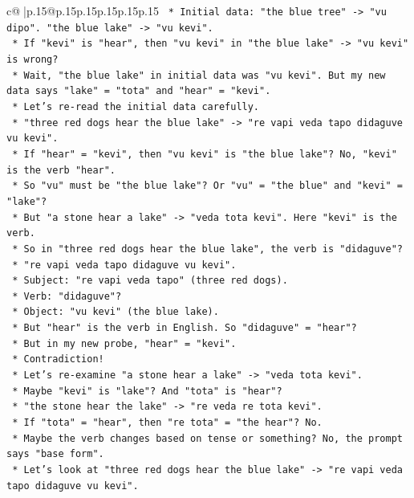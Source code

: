 \documentclass{article}
\begin{document}
{\begin{supertabular}{c@{$\;$}|p{.15\linewidth}@{}p{.15\linewidth}p{.15\linewidth}p{.15\linewidth}p{.15\linewidth}p{.15\linewidth}}
{{{\texttt{    *   Initial data: "the blue tree" {-}> "vu dipo". "the blue lake" {-}> "vu kevi".} \\
\texttt{    *   If "kevi" is "hear", then "vu kevi" in "the blue lake" {-}> "vu kevi" is wrong?} \\
\texttt{    *   Wait, "the blue lake" in initial data was "vu kevi". But my new data says "lake" = "tota" and "hear" = "kevi".} \\
\texttt{    *   Let's re{-}read the initial data carefully.} \\
\texttt{    *   "three red dogs hear the blue lake" {-}> "re vapi veda tapo didaguve vu kevi".} \\
\texttt{    *   If "hear" = "kevi", then "vu kevi" is "the blue lake"? No, "kevi" is the verb "hear".} \\
\texttt{    *   So "vu" must be "the blue lake"? Or "vu" = "the blue" and "kevi" = "lake"?} \\
\texttt{    *   But "a stone hear a lake" {-}> "veda tota kevi". Here "kevi" is the verb.} \\
\texttt{    *   So in "three red dogs hear the blue lake", the verb is "didaguve"?} \\
\texttt{    *   "re vapi veda tapo didaguve vu kevi".} \\
\texttt{    *   Subject: "re vapi veda tapo" (three red dogs).} \\
\texttt{    *   Verb: "didaguve"?} \\
\texttt{    *   Object: "vu kevi" (the blue lake).} \\
\texttt{    *   But "hear" is the verb in English. So "didaguve" = "hear"?} \\
\texttt{    *   But in my new probe, "hear" = "kevi".} \\
\texttt{    *   Contradiction!} \\
\texttt{    *   Let's re{-}examine "a stone hear a lake" {-}> "veda tota kevi".} \\
\texttt{    *   Maybe "kevi" is "lake"? And "tota" is "hear"?} \\
\texttt{    *   "the stone hear the lake" {-}> "re veda re tota kevi".} \\
\texttt{    *   If "tota" = "hear", then "re tota" = "the hear"? No.} \\
\texttt{    *   Maybe the verb changes based on tense or something? No, the prompt says "base form".} \\
\texttt{    *   Let's look at "three red dogs hear the blue lake" {-}> "re vapi veda tapo didaguve vu kevi".} \\
}}}
\end{supertabular}}
\end{document}
